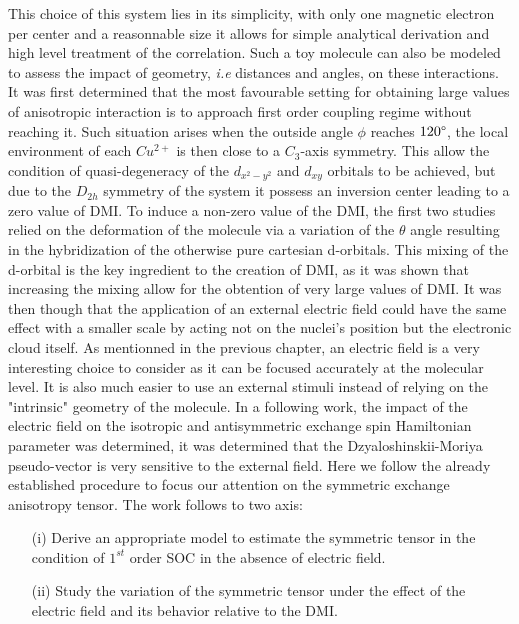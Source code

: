 \documentclass[10pt]{report}
\numberwithin{equation}{section}
\begin{document}
This choice of this system lies in its simplicity, with only one magnetic electron per center and a reasonnable size it allows for simple analytical derivation and high level treatment of the correlation.
Such a toy molecule can also be modeled to assess the impact of geometry, \textit{i.e} distances and angles, on these interactions.
It was first determined that the most favourable setting for obtaining large values of anisotropic interaction is to approach first order coupling regime without reaching it.
Such situation arises when the outside angle $\phi$ reaches $120 \degree$, the local environment of each $Cu^{2+}$ is then close to a $C_3$-axis symmetry.
This allow the condition of quasi-degeneracy of the $d_{x^2-y^2}$ and $d_{xy}$ orbitals to be achieved, but due to the $D_{2h}$ symmetry of the system it possess an inversion center leading to a zero value of DMI.
To induce a non-zero value of the DMI, the first two studies relied on the deformation of the molecule via a variation of the $\theta$ angle resulting in the hybridization of the otherwise pure cartesian d-orbitals.
This mixing of the d-orbital is the key ingredient to the creation of DMI, as it was shown that increasing the mixing allow for the obtention of very large values of DMI.
It was then though that the application of an external electric field could have the same effect with a smaller scale by acting not on the nuclei's position but the electronic cloud itself.
As mentionned in the previous chapter, an electric field is a very interesting choice to consider as it can be focused accurately at the molecular level. 
It is also much easier to use an external stimuli instead of relying on the "intrinsic" geometry of the molecule.
In a following work, the impact of the electric field on the isotropic and antisymmetric exchange spin Hamiltonian parameter was determined, it was determined that the Dzyaloshinskii-Moriya pseudo-vector is very sensitive to the external field.
Here we follow the already established procedure to focus our attention on the symmetric exchange anisotropy tensor.
The work follows to two axis:
\begin{itemize}
    \item[(i)] Derive an appropriate model to estimate the symmetric tensor in the condition of $1^{st}$ order SOC in the absence of electric field.
    \item[(ii)] Study the variation of the symmetric tensor under the effect of the electric field and its behavior relative to the DMI.
\end{itemize}
\end{document}
